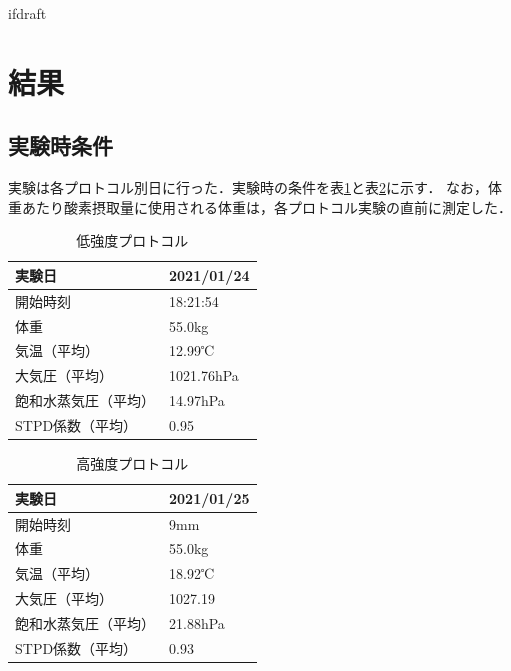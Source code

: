 \expandafter\ifx\csname ifdraft\endcsname\relax
 
\fi

\section{結果}

\subsection{実験時条件}

実験は各プロトコル別日に行った．実験時の条件を表\ref{tb:light_experiment}と表\ref{tb:hard_experiment}に示す．
なお，体重あたり酸素摂取量に使用される体重は，各プロトコル実験の直前に測定した．

\begin{table}[H]
  \begin{center}
  \caption{低強度プロトコル}
  \label{tb:light_experiment}
    \begin{tabular}{|l|l|}
      \hline
      実験日 & 2021/01/24 \\ \hline
      開始時刻 & 18:21:54 \\ \hline
      体重 & 55.0kg \\ \hline
      気温（平均） & 12.99℃ \\ \hline
      大気圧（平均） & 1021.76hPa \\ \hline
      飽和水蒸気圧（平均） & 14.97hPa　\\ \hline
      STPD係数（平均） & 0.95 \\ \hline
    \end{tabular}
  \end{center}
\end{table}

\begin{table}[H]
  \begin{center}
  \caption{高強度プロトコル}
  \label{tb:hard_experiment}
    \begin{tabular}{|l|l|}
      \hline
      実験日 & 2021/01/25 \\ \hline
      開始時刻 & 9mm \\ \hline
      体重 & 55.0kg \\ \hline
      気温（平均） & 18.92℃ \\ \hline
      大気圧（平均） & 1027.19 \\ \hline
      飽和水蒸気圧（平均） & 21.88hPa　\\ \hline
      STPD係数（平均） & 0.93 \\ \hline
    \end{tabular}
  \end{center}
\end{table}

